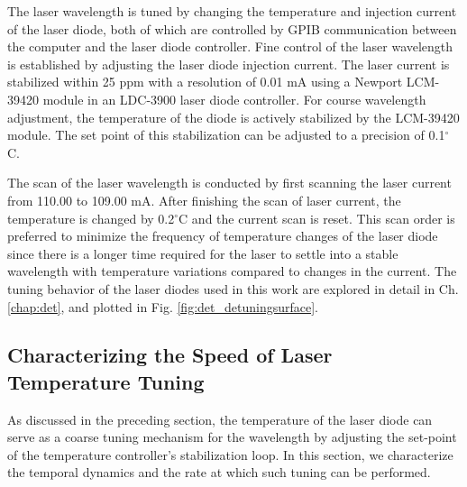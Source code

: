 \documentclass[12pt]{report}
\begin{document}
	The laser wavelength is tuned by changing the temperature and injection current of the
	laser diode, both of which are controlled by GPIB communication between the computer
	and the laser diode controller. Fine control of the laser wavelength is
	established by adjusting the laser diode injection current. The laser current is stabilized
	within 25 ppm with a resolution of 0.01 mA using a Newport LCM-39420 module in an
	LDC-3900 laser diode controller. For course wavelength adjustment, the temperature of the
	diode is actively stabilized by the LCM-39420 module. The set point of this stabilization can be adjusted to a precision of 0.1$^\circ$C.
	
	
	
	The scan of the laser wavelength is conducted by first scanning the laser current from 110.00 to 109.00 mA. After finishing the scan of laser current, the temperature is changed by 0.2$^\circ$C and the current scan is reset. This scan order is preferred to minimize the frequency of temperature changes of the laser diode since there is a longer time required for the laser to settle into a stable wavelength with temperature variations compared to changes in the current. The tuning behavior of the laser diodes used in this work are explored in detail in Ch. \ref{chap:det}, and plotted in Fig. \ref{fig:det_detuningsurface}.
	
	\subsection{Characterizing the Speed of Laser Temperature Tuning} \label{sec:crds_tuning_speed}
	As discussed in the preceding section, the temperature of the laser diode can serve as a coarse tuning mechanism for the wavelength by adjusting the set-point of the temperature controller's stabilization loop. In this section, we characterize the temporal dynamics and the rate at which such tuning can be performed.
	
\end{document}
